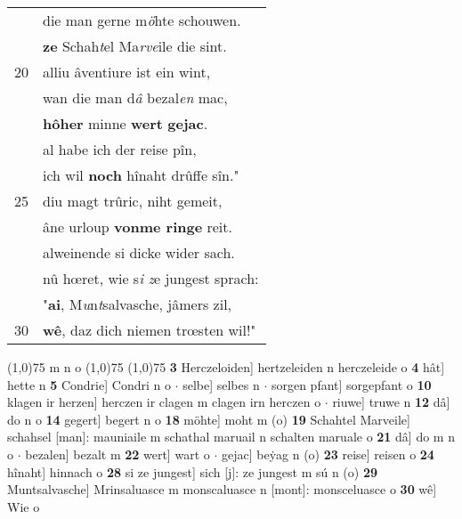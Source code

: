 \documentclass[8pt,a4paper,notitlepage]{article}
\begin{document}
\begin{table}[ht]
\begin{minipage}[t]{0.5\linewidth}
\begin{tabular}{rl}
 & die man gerne m\textit{ö}hte schouwen.\\ 
 & \textbf{ze} Schah\textit{t}el Ma\textit{rve}ile die sint.\\ 
20 & alliu âventiure ist ein wint,\\ 
 & wan die man d\textit{â} bezal\textit{en} mac,\\ 
 & \textbf{hôher} minne \textbf{wert} \textbf{gejac}.\\ 
 & al habe ich der reise pîn,\\ 
 & ich wil \textbf{noch} hînaht drûffe sîn."\\ 
25 & diu magt trûric, niht gemeit,\\ 
 & âne urloup \textbf{vonme ringe} reit.\\ 
 & alweinende si dicke wider sach.\\ 
 & nû hœret, wie s\textit{i} \textit{z}e jungest sprach:\\ 
 & "\textbf{ai}, M\textit{u}n\textit{t}salvasche, jâmers zil,\\ 
30 & \textbf{wê}, daz dich niemen trœsten wil!"\\ 
\end{tabular}
\scriptsize
\line(1,0){75} \newline
m n o \newline
\line(1,0){75} \newline
\newline
\line(1,0){75} \newline
\textbf{3} Herczeloiden] hertzeleiden n herczeleide o \textbf{4} hât] hette n \textbf{5} Condrie] Condri n o  $\cdot$ selbe] selbes n  $\cdot$ sorgen pfant] sorgepfant o \textbf{10} klagen ir herzen] herczen ir clagen m clagen irn herczen o  $\cdot$ riuwe] truwe n \textbf{12} dâ] do n o \textbf{14} gegert] begert n o \textbf{18} möhte] moht m (o) \textbf{19} Schahtel Marveile] schahsel [man]: mauniaile m schathal maruail n schalten maruale o \textbf{21} dâ] do m n o  $\cdot$ bezalen] bezalt m \textbf{22} wert] wart o  $\cdot$ gejac] beẏag n (o) \textbf{23} reise] reisen o \textbf{24} hînaht] hinnach o \textbf{28} si ze jungest] sich [j]: ze jungest m sú n (o) \textbf{29} Muntsalvasche] Mrinsaluasce m monscaluasce n [mont]: monsceluasce o \textbf{30} wê] Wie o \newline
\end{minipage}
\end{table}
\newpage
\end{document}
